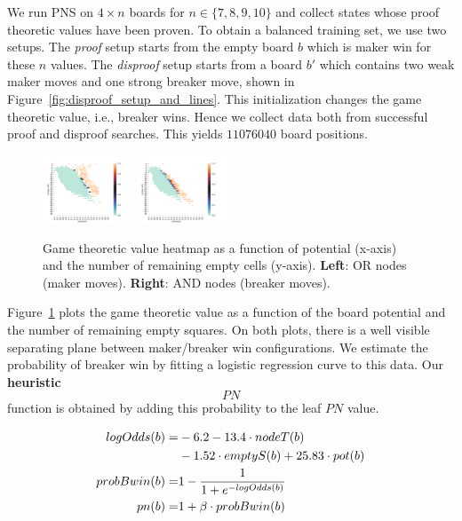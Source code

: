 \documentclass[conference]{IEEEtran}
\theoremstyle{definition}
\newcommand{\pn}{$PN$\xspace}
\begin{document}
We run PNS on $4 \times n$ boards for $n \in \{7, 8, 9, 10\}$ and collect states whose proof theoretic values have been proven. To obtain a balanced training set, we use two setups. The \emph{proof} setup starts from the empty board $b$ which is maker win for these $n$ values. The \emph{disproof} setup starts from a board $b'$ which contains two weak maker moves and one strong breaker move, shown in Figure~\ref{fig:disproof_setup_and_lines}. This initialization changes the game theoretic value, i.e., breaker wins. Hence we collect data both from successful proof and disproof searches. This yields $11076040$ board positions.

\begin{figure}
    \centering
    \includegraphics[width=0.24\textwidth]{figures/pns_win_boundary_AND2.png}
    \includegraphics[width=0.24\textwidth]{figures/pns_win_boundary_OR2.png}
    \caption{Game theoretic value heatmap as a function of potential (x-axis) and the number of remaining empty cells (y-axis). {\bf Left}: OR nodes (maker moves). {\bf Right}: AND nodes (breaker moves).}
    \label{fig:pns_win_boundary}
    \vspace{-10pt}
\end{figure}


Figure~\ref{fig:pns_win_boundary} plots the game theoretic value as a function of the board potential and the number of remaining empty squares. On both plots, there is a well visible separating plane between maker/breaker win configurations. We estimate the probability of breaker win by fitting a logistic regression curve to this data. Our {\bf heuristic $\pn$} function is obtained by adding this probability to the leaf \pn value.

\begin{align*} 
\vspace{-20pt}
logOdds(b) = & -6.2 - 13.4 \cdot nodeT(b) \\
& - 1.52 \cdot emptyS(b) + 25.83 \cdot pot(b) \\
probBwin(b) = & 1- \frac{1}{1+e^{-logOdds(b)}} \\
pn(b) = & 1 + \beta \cdot probBwin(b)
\end{align*}
\end{document}
